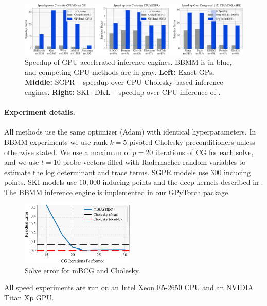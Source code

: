 \begin{figure}[t]
  \includegraphics[width=\textwidth]{chapters/bbmm/figures/sparse_gp_results}
  \caption{
    Speedup of GPU-accelerated inference engines.
    BBMM is in blue, and competing GPU methods are in gray.
    {\bf Left:} Exact GPs. {\bf Middle:} SGPR \cite{titsias2009variational,hensman2013gaussian} -- speedup over CPU Cholesky-based inference engines.
    {\bf Right:} SKI+DKL \cite{wilson2015kernel,wilson2016deep} -- speedup over CPU inference of \citet{dong2017scalable}.
  }
  \label{fig:timing_results}
\end{figure}

\paragraph{Experiment details.} All methods use the same optimizer (Adam) with identical hyperparameters.
In BBMM experiments we use rank $k\!=\!5$ pivoted Cholesky preconditioners unless otherwise stated.
We use a maximum of $p\!=\!20$ iterations of CG for each solve, and
we use $t\!=\!10$ probe vectors filled with Rademacher random variables to estimate the log determinant and trace terms.
SGPR models use $300$ inducing points.
SKI models use $10,\!000$ inducing points and  the deep kernels described in \cite{wilson2016deep}.
The BBMM inference engine is implemented in our GPyTorch package.
\begin{figure}[t!]
  \begin{center}
    \includegraphics[width=0.48\textwidth]{chapters/bbmm/figures/cg_error}
  \end{center}
  \caption{Solve error for mBCG and Cholesky. \label{fig:cg_error}}
\end{figure}
All speed experiments are run on an Intel Xeon E5-2650 CPU and an NVIDIA Titan Xp GPU.

